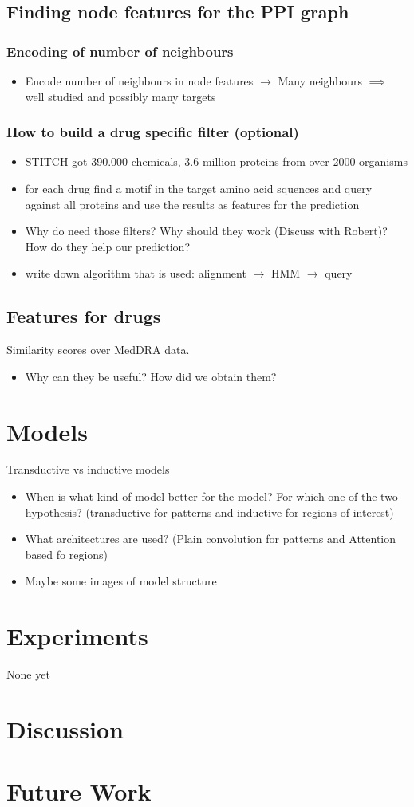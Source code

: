 \documentclass[]{article}
\begin{document}
\subsection{Finding node features for the PPI graph}
\subsubsection{Encoding of number of neighbours}
	\begin{itemize}
		\item Encode number of neighbours in node features $\rightarrow$ Many neighbours $\implies$ well studied and possibly many targets
	\end{itemize}
\subsubsection{How to build a drug specific filter (optional)}
	\begin{itemize}
		\item STITCH got 390.000 chemicals, 3.6 million proteins from over 2000 organisms
		\item for each drug find a motif in the target amino acid squences and query against all proteins and use the results as features for the prediction
		\item Why do need those filters? Why should they work (Discuss with Robert)? How do they help our prediction? 
		\item write down algorithm that is used: alignment $\rightarrow$ HMM $\rightarrow$ query
	\end{itemize}
\subsection{Features for drugs}
	Similarity scores over MedDRA data. 
	\begin{itemize}
		\item Why can they be useful? How did we obtain them?
	\end{itemize}

\section{Models}
	Transductive vs inductive models
	\begin{itemize}
		\item When is what kind of model better for the model? For which one of the two hypothesis? (transductive for patterns and inductive for regions of interest)
		\item What architectures are used? (Plain convolution for patterns and Attention based fo regions)
		\item Maybe some images of model structure
	\end{itemize}

\section{Experiments}
None yet

\section{Discussion}

\section{Future Work}
\end{document}
